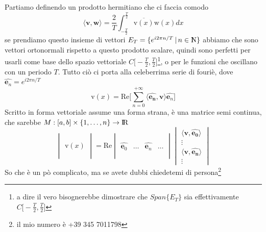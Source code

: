 \documentclass[11pt,a4paper]{report}
\newcommand{\vettore}[1]{\mathbf{#1}}
\newcommand{\vettorec}[1]{\textrm{#1}}
\newcommand{\pscal}[2]{\langle \vettore{#1},\vettore{#2}\rangle}
\theoremstyle{definition}
\theoremstyle{plain}
\theoremstyle{plain}
\begin{document}
			Partiamo definendo un prodotto hermitiano che ci faccia comodo
			\begin{equation}
				\pscal{v}{w}=\frac{2}{T}\int_{-\frac{T}{2}}^\frac{T}{2} \overline{\vettorec v(x)}\vettorec w(x)dx
			\end{equation}
			se prendiamo questo insieme di vettori $E_T=\{e^{i2\pi n/ T} \, | \, n \in \rm I\!\! N\}$ abbiamo che sono vettori ortonormali rispetto a questo prodotto scalare, quindi sono perfetti per usarli come base dello spazio vettoriale $C\big[-\frac{T}{2},\frac{T}{2}\big]$\footnote{a dire il vero bisognerebbe dimostrare che $Span\{E_T\}$ sia effettivamente $C\big[-\frac{T}{2},\frac{T}{2}\big]$}, o per le funzioni che oscillano con un periodo $T$.\newline
			Tutto ciò ci porta alla celeberrima serie di fouriè, dove $\widehat{\vettore e_n}=e^{i2\pi n/ T}$
			\begin{equation}
			\label{serieFuriè}
				\vettorec v(x)=\textrm{Re}\Bigg[\sum_{n=0}^{+\infty} \pscal{\widehat{e_n}}{v}\widehat{\vettore e_n}\Bigg]
			\end{equation}
			Scritto in forma vettoriale assume una forma strana, è una matrice semi continua, che sarebbe $M:[a,b]\times \{1,\dots,n\}\rightarrow \rm I\!R$
			\begin{equation}
				\begin{vmatrix}
					\,\\
					\,\\
					\vettorec v(x)\\
					\,\\
					\,
				\end{vmatrix}
				=\textrm{Re}
				\begin{vmatrix}
					\, & & &\\
					\, & & &\\
					\widehat{\vettore e_0}& \dots & \widehat{\vettore e_n}&\dots\\
					\, & & &\\
					\, & & &
				\end{vmatrix}
				\begin{vmatrix}
					\pscal{v}{\widehat{e_0}}\\
					\vdots\\
					\pscal{v}{\widehat{e_n}}\\
					\vdots
				\end{vmatrix}
			\end{equation}
			So che è un pò complicato, ma se avete dubbi chiedetemi di persona\footnote{il mio numero è +39 345 7011798}
\end{document}
